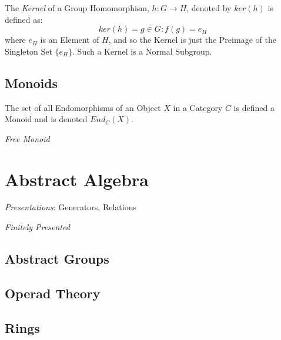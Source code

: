 \documentclass{article}
\begin{document}
The \emph{Kernel} of a Group Homomorphism, $h : G \rightarrow H$,
denoted by $ker(h)$ is defined as:
\[
    ker(h) = {g \in G : f(g) = e_H}
\]
where $e_H$ is an Element of $H$, and so the Kernel is just the
Preimage of the Singleton Set $\{e_H\}$. Such a Kernel is a Normal
Subgroup.

\subsection{Monoids}\label{subsec:monoids}

The set of all Endomorphisms of an Object $X$ in a Category $C$ is
defined a Monoid and is denoted $End_C(X)$.

\emph{Free Monoid}

\section{Abstract Algebra}\label{sec:abstract_algebra}

\emph{Presentations}: Generators, Relations

\emph{Finitely Presented}

\subsection{Abstract Groups}\label{subsec:abstract_groups}

\subsection{Operad Theory}\label{subsec:operad_theory}

\subsection{Rings}\label{subsec:rings}
\end{document}
